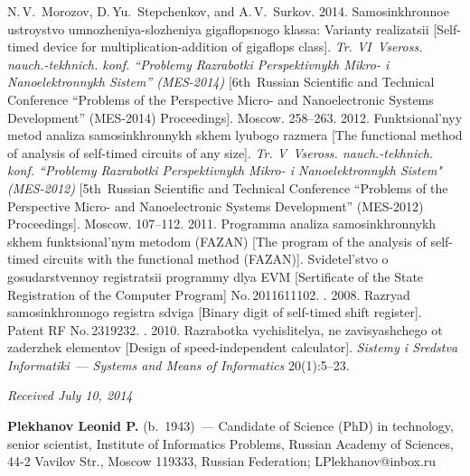 \begin{multicols}{2}
{{\begin{thebibliography}{99}
{N.\,V.~Morozov, D.\,Yu.~Stepchenkov, and A.\,V.~Sur\-kov}. 2014.
Samosinkhronnoe ustroystvo umnozheniya-slozheniya gigaflopsnogo klassa:
Varianty realizatsii [Self-timed device for multiplication-addition of
gigaflops class]. \textit{Tr. VI~Vseross. nauch.-tekhnich. konf.
``Problemy Razrabotki
Perspektivnykh Mikro- i Nanoelektronnykh Sistem'' (MES-2014)}
[6th~Russian Scientific and
Technical Conference ``Problems of the Perspective Micro- and Nanoelectronic
Systems Development'' (MES-2014) Proceedings]. Moscow. 258--263.
 2012. Funktsional'nyy metod analiza samosinkhronnykh skhem lyubogo
razmera [The functional method of analysis of self-timed circuits of any size].
\textit{Tr. V~Vseross. nauch.-tekhnich. konf. ``Problemy Razrabotki
Perspektivnykh Mikro- i Nanoelektronnykh Sistem" (MES-2012)}
[5th~Russian Scientific and Technical Conference ``Problems
of the Perspective Micro- and Nanoelectronic Systems Development''
(MES-2012) Proceedings].
Moscow. 107--112.
 2011. Programma analiza samosinkhronnykh skhem
funktsional'nym
metodom (FAZAN) [The program of the analysis of self-timed circuits with the functional method
(FAZAN)].
Svidetel'stvo o gosudarstvennoy registratsii programmy dlya EVM [Sertificate of
the State Registration of the Computer Program] No.\,2011611102.
.
2008. Razryad samosinkhronnogo registra sdviga [Binary digit of self-timed shift register]. Patent
RF No.\,2319232.
. 2010.
Razrabotka vychislitelya, ne zavisyashchego ot zaderzhek elementov [Design
of speed-independent calculator]. \textit{Sistemy i Sredstva Informatiki}~---
\textit{Systems and Means of Informatics} 20(1):5--23.
\end{thebibliography}

 }
 }

\end{multicols}

\vspace*{-6pt}

\hfill{\small\textit{Received July 10, 2014}}

\vspace*{-18pt}

\Contrl

  \noindent
  \textbf{Plekhanov Leonid P.} (b.\ 1943)~--- Candidate of Science (PhD) in
technology, senior scientist,
Institute of Informatics Problems, Russian
Academy of Sciences, 44-2 Vavilov Str., Moscow 119333, Russian Federation;
LPlekhanov@inbox.ru


\label{end\stat}

\renewcommand{\bibname}{\protect\rm Литература}

